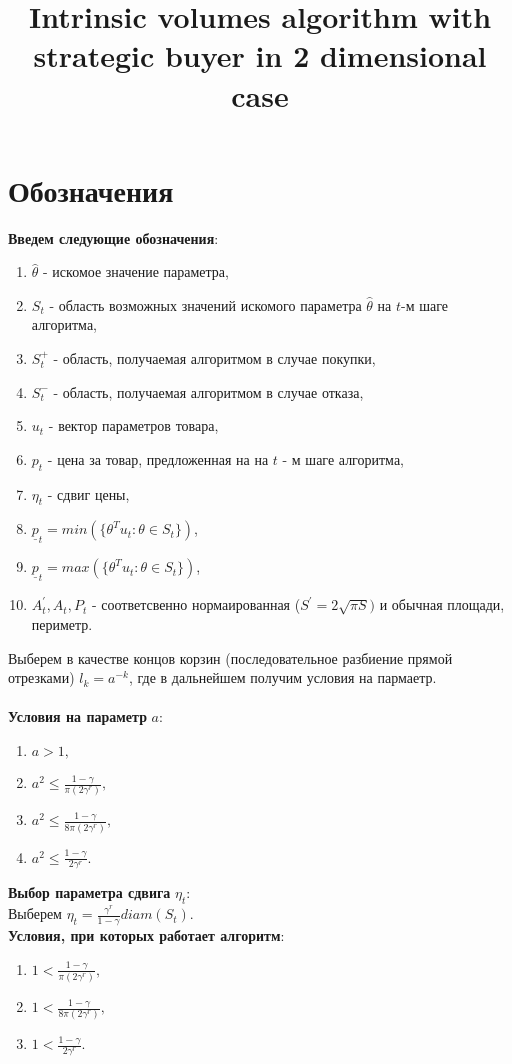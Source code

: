 \documentclass[12 pt, russian]{article}
\title{Intrinsic volumes algorithm with  strategic buyer in 2 dimensional case}
\begin{document}
\maketitle

\section{Обозначения}
\textbf{Введем следующие обозначения}:
\begin{enumerate}
    \item $\hat{\theta}$ - искомое значение параметра,
    \item $S_t$ - область возможных значений искомого параметра $\hat{\theta}$ на $t$-м шаге алгоритма,
    \item $S^{+}_t$ - область, получаемая алгоритмом в случае покупки,
    \item $S^{-}_t$ - область, получаемая алгоритмом в случае отказа,
    \item $u_t$ - вектор параметров товара,
    \item $p_t$ - цена за товар, предложенная на на $t$ - м шаге алгоритма,
    \item $\eta_t$ - сдвиг цены,
    \item $\underline{p}_t = min(\{\theta^T u_t: \theta \in S_t\})$,
    \item $\underline{p}_t = max(\{\theta^T u_t: \theta \in S_t\})$,
    \item $A^{'}_t, A_t, P_t$ - соответсвенно нормаированная ($S^{'} = 2\sqrt{\pi S})$ и обычная площади, периметр.
\end{enumerate}

Выберем в качестве концов корзин (последовательное разбиение прямой отрезками) $l_k = a^{-k}$, где в дальнейшем получим условия на пармаетр.
\\
\\
\textbf{Условия на параметр} $a$:
\begin{enumerate}
    \item $a > 1,$
    \item $a^2 \leq \frac{1 - \gamma}{\pi (2 \gamma^r)},$
    \item $a^2 \leq \frac{1 - \gamma}{8 \pi (2 \gamma^r)},$
    \item $a^2 \leq \frac{1 - \gamma}{2 \gamma^r}.$
\end{enumerate}
\textbf{Выбор параметра сдвига} $\eta_t$:
\\
Выберем $\eta_t = \frac{\gamma^r}{1 - \gamma} diam(S_t).$
\\
\textbf{Условия, при которых работает алгоритм}:
\begin{enumerate}
    \item $1 < \frac{1 - \gamma}{\pi (2 \gamma^r)},$
    \item $1 < \frac{1 - \gamma}{8 \pi (2 \gamma^r)},$
    \item $1 < \frac{1 - \gamma}{2 \gamma^r}.$
\end{enumerate}
\end{document}
